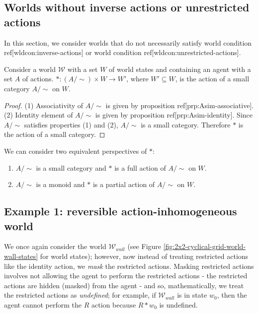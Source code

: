 \subsection{Worlds without inverse actions or unrestricted actions}\label{sec:Worlds without inverse actions or unrestricted actions}

In this section, we consider worlds that do not necessarily satisfy world condition ref[wldcon:inverse-actions] or world condition ref[wldcon:unrestricted-actions].

\begin{proposition}\label{prp:all_worlds_give_small_category_action}
    Consider a world $\mathscr{W}$ with a set $W$ of world states and containing an agent with a set $A$ of actions.
    $*: (A/\sim) \times W \to W'$, where $W' \subseteq W$, is the action of a small category $A/\sim$ on $W$.
\end{proposition}
\begin{proof}
    (1) Associativity of $A/\sim$ is given by proposition ref[prp:Asim-associative].
    (2) Identity element of $A/\sim$ is given by proposition ref[prp:Asim-identity].
    Since $A/\sim$ satisfies properties (1) and (2), $A/\sim$ is a small category.
    Therefore $*$ is the action of a small category.
\end{proof}

\begin{remark}
    We can consider two equivalent perspectives of $*$:
    \begin{enumerate}
        \item $A/\sim$ is a small category and $*$ is a full action of $A/\sim$ on $W$.
        \item $A/\sim$ is a monoid and $*$ is a partial action of $A/\sim$ on $W$.
    \end{enumerate}
\end{remark}

\subsection{Example 1: reversible action-inhomogeneous world}\label{sec:masked reversible action-inhomogeneous world}

We once again consider the world $\mathscr{W}_{wall}$ (see Figure \ref{fig:2x2-cyclical-grid-world-wall-states} for world states); however, now instead of treating restricted actions like the identity action, we \textit{mask} the restricted actions.
Masking restricted actions involves not allowing the agent to perform the restricted actions - the restricted actions are hidden (masked) from the agent - and so, mathematically, we treat the restricted actions as \textit{undefined}; for example, if $\mathscr{W}_{wall}$ is in state $w_{0}$, then the agent cannot perform the $R$ action because $R * w_{0}$ is undefined.

